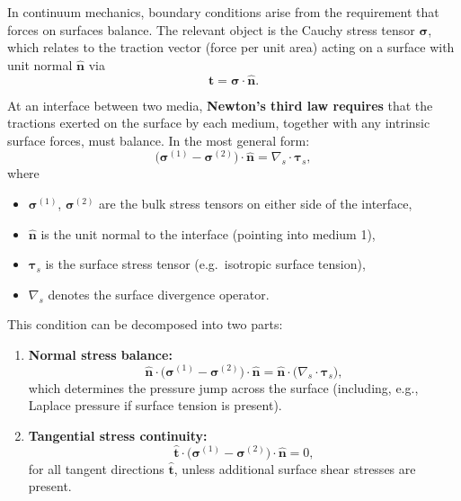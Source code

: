 In continuum mechanics, boundary conditions arise from the requirement that forces 
on surfaces balance. The relevant object is the Cauchy stress tensor 
$\boldsymbol{\sigma}$, which relates to the traction vector (force per unit area) 
acting on a surface with unit normal $\hat{\mathbf{n}}$ via
\begin{equation}
    \mathbf{t} = \boldsymbol{\sigma} \cdot \hat{\mathbf{n}}.
\end{equation}

At an interface between two media, \textbf{Newton’s third law requires} that the tractions 
exerted on the surface by each medium, together with any intrinsic surface forces, 
must balance. In the most general form:
\begin{equation}
    \big(\boldsymbol{\sigma}^{(1)} - \boldsymbol{\sigma}^{(2)}\big) \cdot \hat{\mathbf{n}}
    = \nabla_s \cdot \boldsymbol{\tau}_s,
\end{equation}
where
\begin{itemize}
    \item $\boldsymbol{\sigma}^{(1)}$, $\boldsymbol{\sigma}^{(2)}$ are the bulk stress tensors 
          on either side of the interface,
    \item $\hat{\mathbf{n}}$ is the unit normal to the interface (pointing into medium 1),
    \item $\boldsymbol{\tau}_s$ is the surface stress tensor (e.g.\ isotropic surface tension),
    \item $\nabla_s$ denotes the surface divergence operator.
\end{itemize}

This condition can be decomposed into two parts:
\begin{enumerate}
    \item \textbf{Normal stress balance:}
    \begin{equation}
        \hat{\mathbf{n}} \cdot 
        \big(\boldsymbol{\sigma}^{(1)} - \boldsymbol{\sigma}^{(2)}\big) \cdot \hat{\mathbf{n}}
        = \hat{\mathbf{n}} \cdot \big(\nabla_s \cdot \boldsymbol{\tau}_s\big),
    \end{equation}
    which determines the pressure jump across the surface (including, e.g., Laplace pressure if surface tension is present).

    \item \textbf{Tangential stress continuity:}
    \begin{equation}
        \hat{\mathbf{t}} \cdot 
        \big(\boldsymbol{\sigma}^{(1)} - \boldsymbol{\sigma}^{(2)}\big) \cdot \hat{\mathbf{n}} = 0,
    \end{equation}
    for all tangent directions $\hat{\mathbf{t}}$, unless additional surface shear stresses 
    are present.
\end{enumerate}


